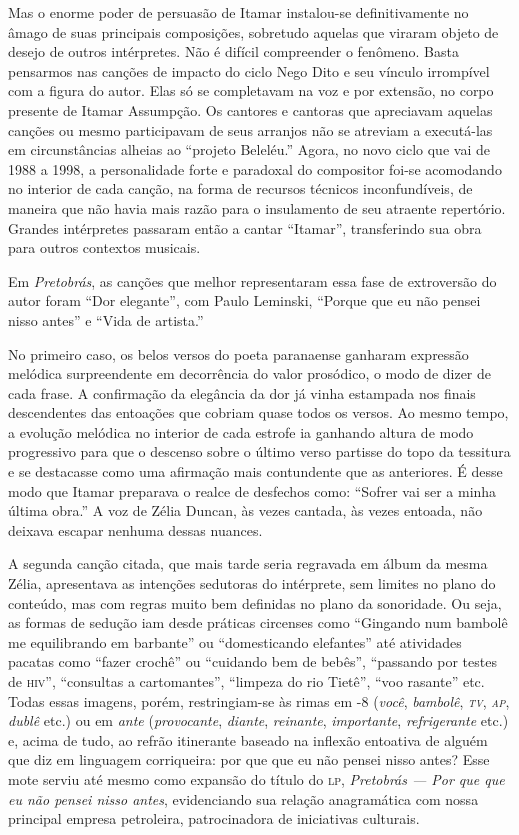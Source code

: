 Mas o enorme poder de persuasão de Itamar instalou-se definitivamente no
âmago de suas principais composições, sobretudo aquelas que viraram
objeto de desejo de outros intérpretes. Não é difícil compreender o
fenômeno. Basta pensarmos nas canções de impacto do ciclo Nego Dito e
seu vínculo irrompível com a figura do autor. Elas só se completavam na
voz e por extensão, no corpo presente de Itamar Assumpção. Os cantores e
cantoras que apreciavam aquelas canções ou mesmo participavam de seus
arranjos não se atreviam a executá-las em circunstâncias alheias ao
``projeto Beleléu.'' Agora, no novo ciclo que vai de 1988 a 1998, a
personalidade forte e paradoxal do compositor foi-se acomodando no
interior de cada canção, na forma de recursos técnicos inconfundíveis,
de maneira que não havia mais razão para o insulamento de seu atraente
repertório. Grandes intérpretes passaram então a cantar ``Itamar'',
transferindo sua obra para outros contextos musicais.

Em \textit{Pretobrás}, as canções que melhor representaram essa fase de
extroversão do autor foram ``Dor elegante'', com Paulo Leminski, ``Porque que
eu não pensei nisso antes'' e ``Vida de artista.''

No primeiro caso, os belos versos do poeta paranaense ganharam expressão
melódica surpreendente em decorrência do valor prosódico, o modo de dizer 
de cada frase. A confirmação da elegância da dor já vinha estampada nos
finais descendentes das entoações que cobriam quase todos os versos. Ao
mesmo tempo, a evolução melódica no interior de cada estrofe ia ganhando
altura de modo progressivo para que o descenso sobre o último verso
partisse do topo da tessitura e se destacasse como uma afirmação mais
contundente que as anteriores. É desse modo que Itamar preparava o
realce de desfechos como: ``Sofrer vai ser a minha última obra.'' A voz
de Zélia Duncan, às vezes cantada, às vezes entoada, não deixava escapar
nenhuma dessas nuances.

A segunda canção citada, que mais tarde seria regravada em álbum da
mesma Zélia, apresentava as intenções sedutoras do intérprete, sem
limites no plano do conteúdo, mas com regras muito bem definidas no
plano da sonoridade. Ou seja, as formas de sedução iam desde práticas
circenses como ``Gingando num bambolê me equilibrando em barbante'' ou
``domesticando elefantes'' até atividades pacatas como ``fazer crochê'' ou ``cuidando bem de bebês'', ``passando por testes de \textsc{hiv}'', ``consultas a
cartomantes'', ``limpeza do rio Tietê'', ``voo rasante'' etc. Todas essas imagens,
porém, restringiam-se às rimas em \textsc{-8} (\textit{você}, \textit{bambolê}, \textit{\textsc{tv}}, \textit{\textsc{ap}}, \textit{dublê} etc.) ou em \textit{ante} (\textit{provocante}, \textit{diante}, \textit{reinante}, \textit{importante}, \textit{refrigerante} etc.) e, acima de tudo, ao refrão itinerante baseado na inflexão entoativa de alguém que diz em
linguagem corriqueira: por que que eu não pensei nisso antes? Esse mote
serviu até mesmo como expansão do título do \textsc{lp}, \textit{Pretobrás --- Por que que
eu não pensei nisso antes}, evidenciando sua relação anagramática com
nossa principal empresa petroleira, patrocinadora de iniciativas
culturais.

